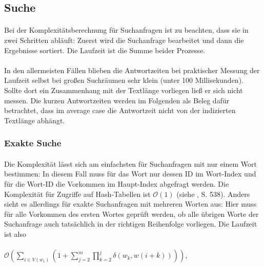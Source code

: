 
\subsection{Suche}
\label{compl-search}

\paragraph{} Bei der Komplexitätsberechnung für Suchanfragen ist zu beachten, dass sie in zwei Schritten abläuft: Zuerst wird die Suchanfrage bearbeitet und dann die Ergebnisse sortiert. Die Laufzeit ist die Summe beider Prozesse.
\paragraph{} In den allermeisten Fällen blieben die Antwortzeiten bei praktischer Messung der Laufzeit selbst bei großen Suchräumen sehr klein (unter 100 Millisekunden). Sollte dort ein Zusammenhang mit der Textlänge vorliegen ließ er sich nicht messen. Die kurzen Antwortzeiten werden im Folgenden als Beleg dafür betrachtet, dass im average case die Antwortzeit nicht von der indizierten Textlänge abhängt.

\subsubsection{Exakte Suche}

\paragraph{} Die Komplexität lässt sich am einfachsten für Suchanfragen mit nur einem Wort bestimmen: In diesem Fall muss für das Wort nur dessen ID im Wort-Index und für die Wort-ID die Vorkommen im Haupt-Index abgefragt werden. Die Komplexität für Zugriffe auf Hash-Tabellen ist $\mathcal{O}(1)$ (siehe \cite{knuth}, S. 538). Anders sieht es allerdings für exakte Suchanfragen mit mehreren Worten aus: Hier muss für alle Vorkommen des ersten Wortes geprüft werden, ob alle übrigen Worte der Suchanfrage auch tatsächlich in der richtigen Reihenfolge vorliegen. Die Laufzeit ist also 

\paragraph{} $\mathcal{O}\left(\sum_{i \in V(w_1)} \left( 1 + \sum_{j=2}^m \prod_{k=2}^j \delta(w_k,w(i+k)) \right)\right)$,


